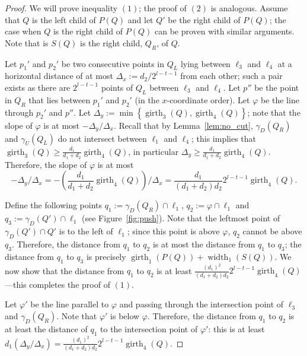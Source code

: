 \documentclass{article}
\begin{document}
\begin{proof}
We will prove inequality $(1)$; the proof of $(2)$ is analogous. 
Assume that $Q$ is the left child of $P(Q)$ and let $Q'$ be the right child of $P(Q)$; the case when $Q$ is the right child of $P(Q)$
can be proven with similar arguments. Note that is $S(Q)$ is the right child, $Q_R$, of $Q$.
 
Let $p_1'$ and $p_2'$ be two consecutive points in $Q_L$ lying between $\ell_{3}$
and $\ell_4$ at a horizontal distance of at most  
 $\Delta_x:=d_{2}/2^{l-t-1}$ from each other; such a pair exists as there  are $2^{l-t-1}$ points
of $Q_L$ between $\ell_{3}$ and $\ell_4$.
Let $p''$ be the point in $Q_R$ that lies between $p_1'$ and $p_2'$ (in the $x$-coordinate order).
Let $\varphi$ be the line through $p_2'$ and $p''$. 
Let $\Delta_y:=\min\left\{\operatorname{girth}_{3}(Q),\operatorname{girth}_4(Q)\right\}$; 
note that the slope of $\varphi$ is at most  $-\Delta_y/\Delta_x$.
Recall that by Lemma~\ref{lem:no_cut}, $\gamma_D(Q_R)$ and $\gamma_U(Q_L)$ do not
intersect between $\ell_1$ and $\ell_4$; this implies that $\operatorname{girth}_{3}(Q) \ge \frac{d_1}{d_1+d_2}\operatorname{girth}_{4}(Q)$,
in particular
 $\Delta_y \ge \frac{d_1}{d_1+d_2}\operatorname{girth}_{4}(Q)$.
Therefore, the slope of $\varphi$ is at most
\[-\Delta_y/\Delta_x=-\left ( \frac{d_1}{d_1+d_2}\operatorname{girth}_{4}(Q) \right )/\Delta_x=\frac{d_1}{(d_1+d_2)d_2}2^{l-t-1}\operatorname{girth}_{4}(Q).\]

Define the following points $q_1:=\gamma_D(Q_R) \cap \ell_{1}$,  $q_2:=\varphi \cap \ell_1$ 
and $q_3:=\gamma_D(Q') \cap \ell_{1}$ (see Figure~\ref{fig:push}).
Note that the leftmost
point of $\gamma_D(Q')\cap Q'$ is to the left of $\ell_1$; since this point
is above $\varphi$, $q_2$ cannot be above $q_3$.
Therefore, the distance from $q_1$ to $q_2$
is at most the distance from $q_1$ to $q_3$; the distance from $q_1$ to $q_3$ is precisely 
$\operatorname{girth}_1(P(Q))+ \operatorname{width}_1(S(Q))$. We now show that the distance
from $q_1$ to $q_2$ is at least 
$\frac{(d_1)^2}{(d_1+d_2)d_2} 2^{l-t-1} \operatorname{girth}_4(Q)$---this completes the proof of $(1)$.

Let $\varphi'$ be the line parallel to $\varphi$ and passing through the intersection
point of $\ell_{3}$ and $\gamma_D(Q_R)$. Note that $\varphi'$ is below
$\varphi$. Therefore, the distance from $q_1$ to $q_2$ is at least the
distance of $q_1$ to the intersection point 
of $\varphi'$: this is at least $d_1(\Delta_y/\Delta_x)=\frac{(d_1)^2}{(d_1+d_2)d_2} 2^{l-t-1} \operatorname{girth}_4(Q)$.
\end{proof}  
\end{document}
